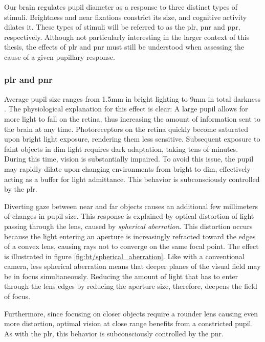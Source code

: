 
Our brain regulates pupil diameter as a response to three distinct types of stimuli. Brightness and near fixations constrict its size, and cognitive activity dilates it. These types of stimuli will be referred to as the \acrfull{plr}, \acrfull{pnr} and \acrfull{ppr}, respectively. Although not particularly interesting in the larger context of this thesis, the effects of \acrshort{plr} and \acrshort{pnr} must still be understood when assessing the cause of a given pupillary response. 

\subsubsection{\acrfull{plr} and \acrfull{pnr}} \label{sec:bt/cognitive_impacts/plr_pnr}

Average pupil size ranges from 1.5mm in bright lighting to 9mm in total darkness \cite{eckstein2017}. The physiological explanation for this effect is clear: A large pupil allows for more light to fall on the retina, thus increasing the amount of information sent to the brain at any time. Photoreceptors on the retina quickly become saturated upon bright light exposure, rendering them less sensitive. Subsequent exposure to faint objects in dim light requires dark adaptation, taking tens of minutes. During this time, vision is substantially impaired. To avoid this issue, the pupil may rapidly dilate upon changing environments from bright to dim, effectively acting as a buffer for light admittance. This behavior is subconsciously controlled by the \acrshort{plr}.

Diverting gaze between near and far objects causes an additional few millimeters of changes in pupil size. This response is explained by optical distortion of light passing through the lens, caused by \textit{spherical aberration}. This distortion occurs because the light entering an aperture is increasingly refracted toward the edges of a convex lens, causing rays not to converge on the same focal point. The effect is illustrated in figure \ref{fig:bt/spherical_aberration}. Like with a conventional camera, less spherical aberration means that deeper planes of the visual field may be in focus simultaneously. Reducing the amount of light that has to enter through the lens edges by reducing the aperture size, therefore, deepens the field of focus.

Furthermore, since focusing on closer objects require a rounder lens causing even more distortion, optimal vision at close range benefits from a constricted pupil. As with the \acrshort{plr}, this behavior is subconsciously controlled by the \acrshort{pnr}.

